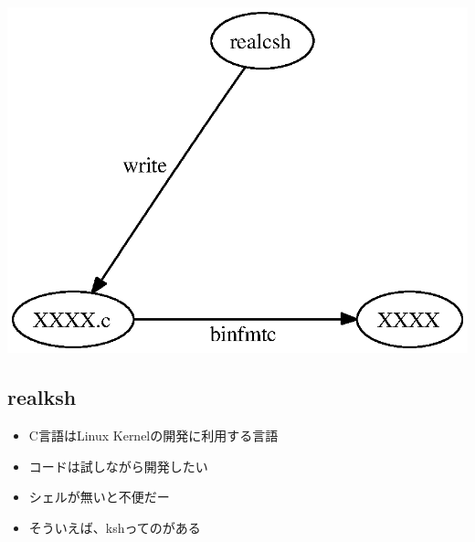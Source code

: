 \documentclass[cjk,dvipdfmx,14pt]{beamer}
\begin{document}
\begin{frame}

{\small \tt 
{}}
\end{frame}


\begin{frame}
\includegraphics[width=0.8\hsize]{image200609/realcsh.eps}
\end{frame}

\subsection{realksh}

\begin{frame}
\begin{itemize}[<+->]
 \item C言語はLinux Kernelの開発に利用する言語
 \item コードは試しながら開発したい
 \item シェルが無いと不便だー
 \item そういえば、kshってのがある
\end{itemize}
\end{frame}
\end{document}
